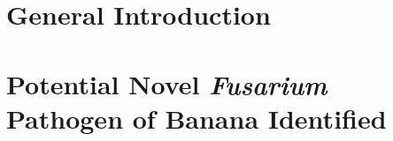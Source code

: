 \documentclass[11pt,a4paper]{report}
\begin{document}


\clearpage
\tableofcontents                     
\listoftables                     
\listoffigures                    
\begin{thesisacknowledgments}        
       
\end{thesisacknowledgments}

\begin{thesisdeclaration}       
 
\end{thesisdeclaration}

\begin{thesisabstract}              
  \begin{singlespace}    
          
 \end{singlespace}
\end{thesisabstract}

\printacronyms[name=Abbreviations]

\renewcommand{\arraystretch}{1.5} %

\setlength{}
\setlength{\epigraphrule}{0pt}

    
\chapter{General Introduction} 
    
    
\chapter{Potential Novel \textit{Fusarium} Pathogen of Banana Identified }
    
    
\end{document}

